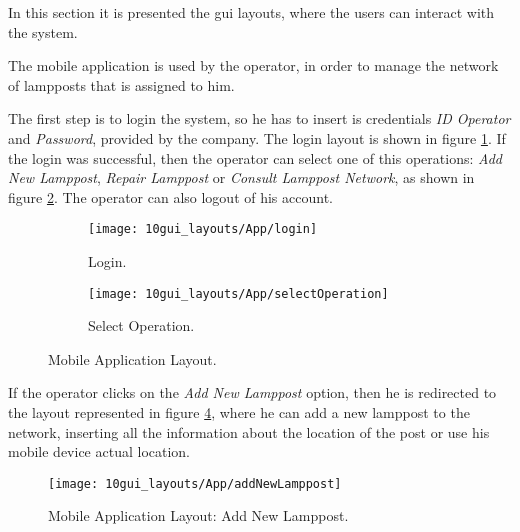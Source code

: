 In this section it is presented the \ac{gui} layouts, where the users can interact with the system.


The mobile application is used by the operator, in order to manage the network of lampposts that is assigned to him. 

The first step is to login the system, so he has to insert is credentials \textit{ID Operator} and \textit{Password}, provided by the company. The login layout is shown in figure \ref{fig:login}. If the login was successful, then the operator can select one of this operations: \textit{Add New Lamppost}, \textit{Repair Lamppost} or \textit{Consult Lamppost Network}, as shown in figure \ref{fig:selectOperation}. The operator can also logout of his account.



\begin{figure}[H]
	\centering
	\begin{subfigure}{.5\textwidth}
		\centering
		\texttt{[image: 10gui\_layouts/App/login]}
		\caption{Login.}
		\label{fig:login}
	\end{subfigure}%
	\begin{subfigure}{.5\textwidth}
		\centering
		\texttt{[image: 10gui\_layouts/App/selectOperation]}
		\caption{Select Operation.}
		\label{fig:selectOperation}
	\end{subfigure}
	\caption{Mobile Application Layout.}
	\label{fig:App}
\end{figure}

If the operator clicks on the \textit{Add New Lamppost} option, then he is redirected to the layout represented in figure \ref{fig:addNewLamppost}, where he can add a new lamppost to the network, inserting all the information about the location of the post or use his mobile device actual location. 

\begin{figure}[H]
	\centering	
	\texttt{[image: 10gui\_layouts/App/addNewLamppost]}
	\caption{Mobile Application Layout: Add New Lamppost.}
	\label{fig:addNewLamppost}
\end{figure}

